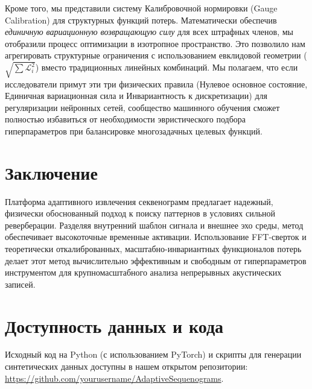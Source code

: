 \documentclass[11pt,a4paper]{article}
\begin{document}
Кроме того, мы представили систему Калибровочной нормировки (Gauge Calibration) для структурных функций потерь. Математически обеспечив \textit{единичную вариационную возвращающую силу} для всех штрафных членов, мы отобразили процесс оптимизации в изотропное пространство. Это позволило нам агрегировать структурные ограничения с использованием евклидовой геометрии ($\sqrt{\sum \mathcal{L}_i^2}$) вместо традиционных линейных комбинаций. Мы полагаем, что если исследователи примут эти три физических правила (Нулевое основное состояние, Единичная вариационная сила и Инвариантность к дискретизации) для регуляризации нейронных сетей, сообщество машинного обучения сможет полностью избавиться от необходимости эвристического подбора гиперпараметров при балансировке многозадачных целевых функций.

\section{Заключение}
Платформа адаптивного извлечения секвенограмм предлагает надежный, физически обоснованный подход к поиску паттернов в условиях сильной реверберации. Разделяя внутренний шаблон сигнала и внешнее эхо среды, метод обеспечивает высокоточные временные активации. Использование FFT-сверток и теоретически откалиброванных, масштабно-инвариантных функционалов потерь делает этот метод вычислительно эффективным и свободным от гиперпараметров инструментом для крупномасштабного анализа непрерывных акустических записей.

\section*{Доступность данных и кода}
Исходный код на Python (с использованием PyTorch) и скрипты для генерации синтетических данных доступны в нашем открытом репозитории: \url{https://github.com/yourusername/AdaptiveSequenograms}.



\end{document}
